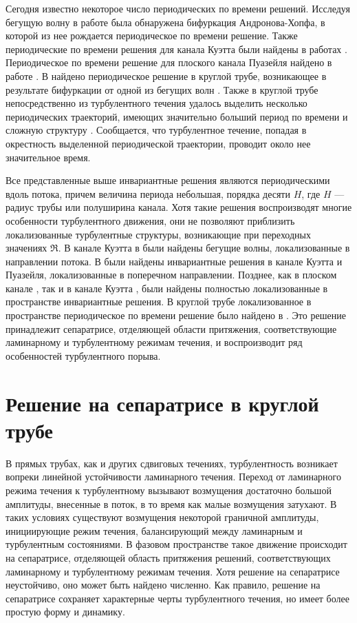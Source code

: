Сегодня известно некоторое число периодических по времени решений. Исследуя бегущую волну \cite{Nagata1990} в работе \cite{Clever1997} была обнаружена бифуркация Андронова-Хопфа, в которой из нее рождается периодическое по времени решение. Также периодические по времени решения для канала Куэтта были найдены в работах \cite{Kawahara2001, Viswanath2007}. Периодическое по времени решение для плоского канала Пуазейля найдено в работе \cite{Toh2003}. В \cite{Duguet2008} найдено периодическое решение в круглой трубе, возникающее в результате бифуркации от одной из бегущих волн \cite{Pringle2007}. Также в круглой трубе непосредственно из турбулентного течения удалось выделить несколько периодических траекторий, имеющих значительно больший период по времени и сложную структуру \cite{Altmeyer2015}. Сообщается, что турбулентное течение, попадая в окрестность выделенной периодической траектории, проводит около нее значительное время. 

Все представленные выше инвариантные решения являются периодическими вдоль потока, причем величина периода небольшая, порядка десяти $H$, где $H$ --- радиус трубы или полуширина канала. Хотя такие решения воспроизводят многие особенности турбулентного движения, они не позволяют приблизить локализованные турбулентные структуры, возникающие при переходных значениях $\Re$. В канале Куэтта в \cite{Cherhabili1997, Ehrenstein2008, Schneider2010} были найдены бегущие волны, локализованные в направлении потока. В \cite{Gibson2014} были найдены инвариантные решения в канале Куэтта и Пуазейля, локализованные в поперечном направлении. Позднее, как в плоском канале \cite{Zammert2014}, так и в канале Куэтта \cite{Brand2014}, были найдены полностью локализованные в пространстве инвариантные решения. В круглой трубе локализованное в пространстве периодическое по времени решение было найдено в \cite{Avila2013}. Это решение принадлежит сепаратрисе, отделяющей области притяжения, соответствующие ламинарному и турбулентному режимам течения, и воспроизводит ряд особенностей турбулентного порыва. 


\section{Решение на сепаратрисе в круглой трубе}

В прямых трубах, как и других сдвиговых течениях, турбулентность возникает вопреки линейной устойчивости ламинарного течения. Переход от ламинарного режима течения к турбулентному вызывают возмущения достаточно большой амплитуды, внесенные в поток, в то время как малые возмущения затухают. В таких условиях существуют возмущения некоторой граничной амплитуды, инициирующие режим течения, балансирующий между ламинарным и турбулентным состояниями. В фазовом пространстве такое движение происходит на сепаратрисе, отделяющей область притяжения решений, соответствующих ламинарному и турбулентному режимам течения. Хотя решение на сепаратрисе неустойчиво, оно может быть найдено численно. Как правило, решение на сепаратрисе сохраняет характерные черты турбулентного течения, но имеет более простую форму и динамику.

